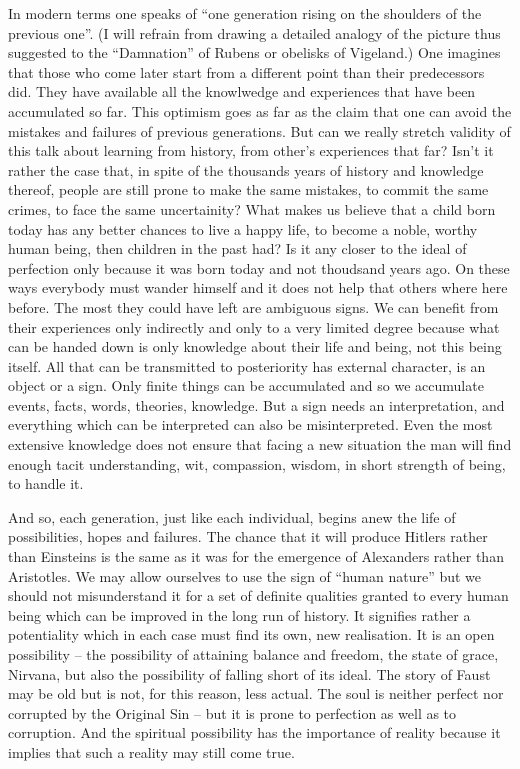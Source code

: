 In modern terms one speaks of ``one generation rising on the shoulders of
the previous one''. (I will refrain from drawing a detailed analogy of the 
picture thus suggested to the 
``Damnation'' of Rubens or obelisks of Vigeland.) One imagines that those who
come later start from a different point than their predecessors did. They have
available all the knowlwedge and experiences that have been accumulated so 
far. This optimism goes as far as the claim that one can avoid the mistakes and
failures of previous generations. But can we really stretch validity of this 
talk about learning from history, from other's experiences that far? Isn't it
rather the case that, in spite of the thousands  years of history and
knowledge thereof, people are still prone to make the same mistakes, to 
commit the same crimes, to face the same uncertainity? What makes us believe
that a child born today has any better chances to live a happy life, to
become a noble, worthy human being, then children in the past had? Is it any
closer to the ideal of perfection only because it was born today and not 
thoudsand years ago. On these ways everybody must wander himself and it does 
not help that others where here before. The most they could have left are
ambiguous signs. We can benefit from their experiences only indirectly and
only to a very limited degree because what can be handed down is only 
knowledge about their life and being, not this being itself. All that can be
transmitted to posteriority has external character, is an object or a sign.
Only finite things can be accumulated and so we accumulate events, facts,
words, theories, knowledge. But a sign needs an interpretation,
and everything which can be interpreted can also be misinterpreted. Even the
most extensive knowledge does not ensure that facing a new situation the man 
will find enough tacit understanding, wit, compassion, wisdom, in short 
strength of being, to handle it.

And so, each generation, just like each individual, begins anew the life of 
possibilities, hopes and failures. The chance that it will produce Hitlers
rather than Einsteins is the same as it was for the emergence of Alexanders
rather than Aristotles.  We may allow ourselves to use the sign of ``human nature''
but we should not misunderstand it for a set of definite qualities granted to
every human being which can be improved in the long run of history. It
signifies rather a potentiality which in each case must find its own, new
realisation. It is an open possibility -- the possibility of attaining balance
and freedom, the state of grace, Nirvana, but also the possibility of
falling short of its ideal. The story of Faust may be old but is not, for this
reason, less actual. The soul is neither perfect nor corrupted by the Original Sin 
-- but it is prone to perfection as well as to corruption.
And the spiritual  possibility has
the importance of reality because it implies that such a reality may still
come true.

